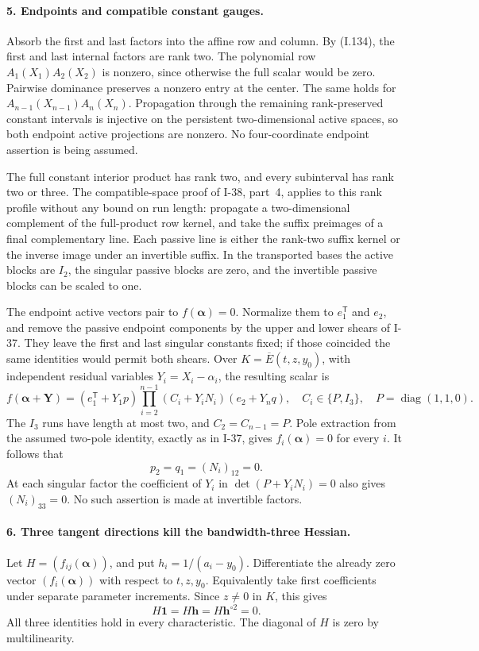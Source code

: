 \paragraph{5. Endpoints and compatible constant gauges.}
Absorb the first and last factors into the affine row and column.
By (I.134), the first and last internal factors are rank two.
The polynomial row $A_1(X_1)A_2(X_2)$ is nonzero, since otherwise
the full scalar would be zero. Pairwise dominance preserves a
nonzero entry at the center. The same holds for
$A_{n-1}(X_{n-1})A_n(X_n)$. Propagation through the remaining
rank-preserved constant intervals is injective on the persistent
two-dimensional active spaces, so both endpoint active
projections are nonzero. No four-coordinate endpoint assertion
is being assumed.

The full constant interior product has rank two, and every
subinterval has rank two or three. The compatible-space proof
of I-38, part~4, applies to this rank profile without any bound
on run length: propagate a two-dimensional complement of the
full-product row kernel, and take the suffix preimages of a
final complementary line. Each passive line is either the
rank-two suffix kernel or the inverse image under an invertible
suffix. In the transported bases the active blocks are
$I_2$, the singular passive blocks are zero, and the invertible
passive blocks can be scaled to one.

The endpoint active vectors pair to $f(\boldsymbol\alpha)=0$.
Normalize them to $e_1^{\mathsf T}$ and $e_2$, and remove the
passive endpoint components by the upper and lower shears of
I-37. They leave the first and last singular constants fixed;
if those coincided the same identities would permit both
shears. Over $K=\overline E(t,z,y_0)$, with independent residual
variables $Y_i=X_i-\alpha_i$, the resulting scalar is
\[
 f(\boldsymbol\alpha+\mathbf Y)=
 (e_1^{\mathsf T}+Y_1p)
 \prod_{i=2}^{n-1}(C_i+Y_iN_i)
 (e_2+Y_nq),
 \quad C_i\in\{P,I_3\},\quad P=\operatorname{diag}(1,1,0).
 \tag{I.142}
\]
The $I_3$ runs have length at most two, and $C_2=C_{n-1}=P$.
Pole extraction from the assumed two-pole identity, exactly
as in I-37, gives $f_i(\boldsymbol\alpha)=0$ for every $i$.
It follows that
\[
 p_2=q_1=(N_i)_{12}=0.
 \tag{I.143}
\]
At each singular factor the coefficient of $Y_i$ in
$\det(P+Y_iN_i)=0$ also gives $(N_i)_{33}=0$.
No such assertion is made at invertible factors.

\paragraph{6. Three tangent directions kill the bandwidth-three Hessian.}
Let $H=(f_{ij}(\boldsymbol\alpha))$, and put
$h_i=1/(a_i-y_0)$. Differentiate the already zero vector
$(f_i(\boldsymbol\alpha))$ with respect to $t,z,y_0$.
Equivalently take first coefficients under separate parameter
increments. Since $z\ne0$ in $K$, this gives
\[
 H\mathbf1=H\mathbf h=H\mathbf h^{\circ2}=0.
 \tag{I.144}
\]
All three identities hold in every characteristic. The diagonal
of $H$ is zero by multilinearity.

